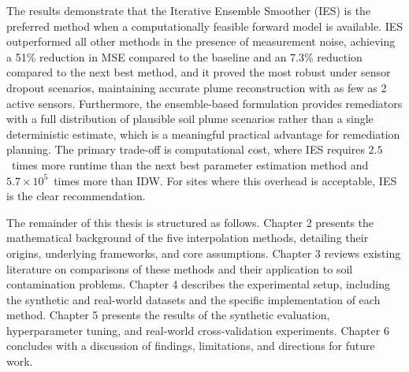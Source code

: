 The results demonstrate that the Iterative Ensemble Smoother (IES) is the preferred method when a computationally feasible forward model is available. IES outperformed all other methods in the presence of measurement noise, achieving a 51\% reduction in MSE compared to the baseline and an 7.3\% reduction compared to the next best method, and it proved the most robust under sensor dropout scenarios, maintaining accurate plume reconstruction with as few as 2 active sensors. Furthermore, the ensemble-based formulation provides remediators with a full distribution of plausible soil plume scenarios rather than a single deterministic estimate, which is a meaningful practical advantage for remediation planning. The primary trade-off is computational cost, where IES requires $2.5$~times more runtime than the next best parameter estimation method and $5.7 \times 10^{5}$~times more than IDW. For sites where this overhead is acceptable, IES is the clear recommendation.

The remainder of this thesis is structured as follows. Chapter 2 presents the mathematical background of the five interpolation methods, detailing their origins, underlying frameworks, and core assumptions. Chapter 3 reviews existing literature on comparisons of these methods and their application to soil contamination problems. Chapter 4 describes the experimental setup, including the synthetic and real-world datasets and the specific implementation of each method. Chapter 5 presents the results of the synthetic evaluation, hyperparameter tuning, and real-world cross-validation experiments. Chapter 6 concludes with a discussion of findings, limitations, and directions for future work.